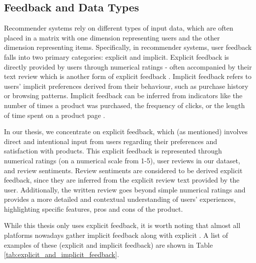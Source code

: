 \subsection{Feedback and Data Types}
\label{subsubsec:3 Feedback and Data Types}

Recommender systems rely on different types of input data, which are often placed in a matrix with one dimension representing users and the other dimension representing items. Specifically, in recommender systems, user feedback falls into two primary categories: explicit and implicit. Explicit feedback is directly provided by users through numerical ratings - often accompanied by their text review which is another form of explicit feedback \cite{koren2009collaborative}. Implicit feedback refers to users' implicit preferences derived from their behaviour, such as purchase history or browsing patterns. Implicit feedback can be inferred from indicators like the number of times a product was purchased, the frequency of clicks, or the length of time spent on a product page \cite{koren2009collaborative}. 

In our thesis, we concentrate on explicit feedback, which (as mentioned) involves direct and intentional input from users regarding their preferences and satisfaction with products. This explicit feedback is represented through numerical ratings (on a numerical scale from 1-5), user reviews in our dataset, and review sentiments. Review sentiments are considered to be derived explicit feedback, since they are inferred from the explicit review text provided by the user\cite{chen2015recommender}. Additionally, the written review goes beyond simple numerical ratings and provides a more detailed and contextual understanding of users' experiences, highlighting specific features, pros and cons of the product. 

While this thesis only uses explicit feedback, it is worth noting that almost all platforms nowadays gather implicit feedback along with explicit \cite{koren2009collaborative}. A list of examples of these (explicit and implicit feedback) are shown in Table \ref{tab:explicit_and_implicit_feedback}.

